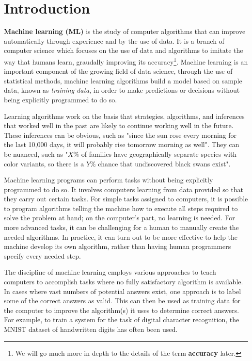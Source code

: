 \chapter{Introduction}

\textbf{Machine learning (ML)} is the study of computer algorithms that can improve automatically through experience and by the use of data. It is a branch of computer science which focuses on the use of data and algorithms to imitate the way that humans learn, graudally improving its accuracy\footnote{We will go much more in depth to the details of the term \textbf{accuracy} later.}.
Machine learning is an important component of the growing field of data science, through the use of statistical methods, machine learning algorithms build a model based on sample data, known as \emph{training data}, in order to make predictions or decisions without being explicitly programmed to do so.

Learning algorithms work on the basis that strategies, algorithms, and inferences that worked well in the past are likely to continue working well in the future. These inferences can be obvious, such as "since the sun rose every morning for the last 10,000 days, it will probably rise tomorrow morning as well". They can be nuanced, such as "\(X\%\) of families have geographically separate species with color variants, so there is a \(Y\%\) chance that undiscovered black swans exist".

Machine learning programs can perform tasks without being explicitly programmed to do so. It involves computers learning from data provided so that they carry out certain tasks. For simple tasks assigned to computers, it is possible to program algorithms telling the machine how to execute all steps required to solve the problem at hand; on the computer's part, no learning is needed. For more advanced tasks, it can be challenging for a human to manually create the needed algorithms. In practice, it can turn out to be more effective to help the machine develop its own algorithm, rather than having human programmers specify every needed step.

The discipline of machine learning employs various approaches to teach computers to accomplish tasks where no fully satisfactory algorithm is available. In cases where vast numbers of potential answers exist, one approach is to label some of the correct answers as valid. This can then be used as training data for the computer to improve the algorithm(s) it uses to determine correct answers. For example, to train a system for the task of digital character recognition, the MNIST dataset of handwritten digits has often been used.

